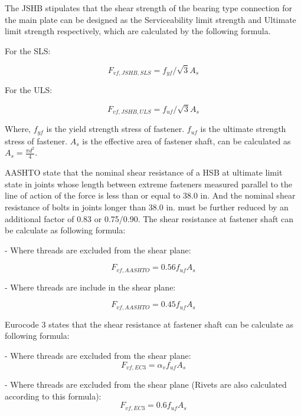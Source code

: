 The \ac{JSHB} stipulates that the shear strength of the bearing type connection for the main plate can be designed as the Serviceability limit strength and Ultimate limit strength respectively, which are calculated by the following formula.

For the SLS:

\begin{equation}
    F_{vf,JSHB,SLS} = f_{yf}/\sqrt{3}A_s
\end{equation}

For the ULS:

\begin{equation}
    F_{vf,JSHB,ULS} = f_{uf}/\sqrt{3}A_s
\end{equation}


Where, $f_{yf}$ is the yield strength stress of fastener. $f_{uf}$ is the ultimate strength stress of fastener. $A_s$ is the effective area of fastener shaft, can be calculated as $A_s = \frac{\pi d^2}{4}$.

\ac{AASHTO} \cite{AASHTO2020} state that the nominal shear resistance of a HSB at ultimate limit state in joints whose length between extreme fasteners measured parallel to the line of action of the force is less than or equal to 38.0 in. And the nominal shear resistance of bolts in joints longer than 38.0 in. must be further reduced by an additional factor of 0.83 or 0.75/0.90.
The shear resistance at fastener shaft can be calculate as following formula:

- Where threads are excluded from the shear plane:

\begin{equation}
    F_{vf,AASHTO} = 0.56f_{uf}A_s
\end{equation}

- Where threads are include in the shear plane:

\begin{equation}
    F_{vf,AASHTO} = 0.45f_{uf}A_s
\end{equation}

Eurocode 3 states that the  shear resistance at fastener shaft can be calculate as following formula:

- Where threads are excluded from the shear plane:
\begin{equation}
    F_{vf,EC3} = \alpha_v f_{uf}A_s
\end{equation}

- Where threads are excluded from the shear plane (Rivets are also calculated according to this formula):
\begin{equation}
    F_{vf,EC3} = 0.6 f_{uf}A_s
\end{equation}

